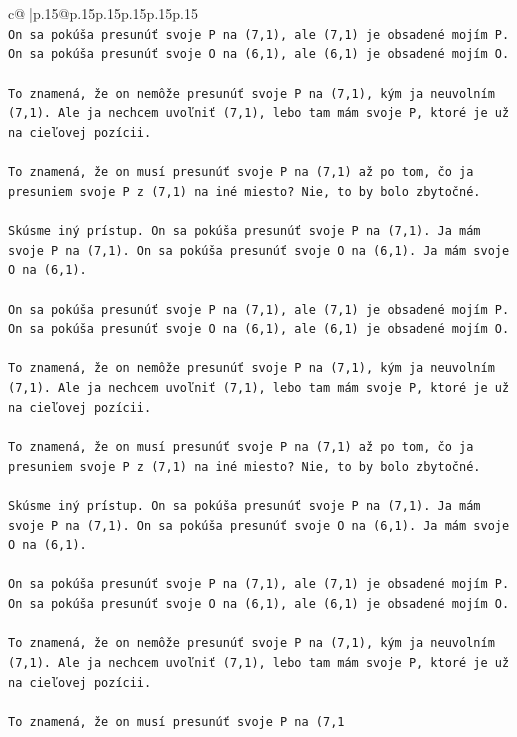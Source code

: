 \documentclass{article}
\begin{document}
{\begin{supertabular}{c@{$\;$}|p{.15\linewidth}@{}p{.15\linewidth}p{.15\linewidth}p{.15\linewidth}p{.15\linewidth}p{.15\linewidth}}
{{{\\ 
\texttt{On sa pokúša presunúť svoje P na (7,1), ale (7,1) je obsadené mojím P. On sa pokúša presunúť svoje O na (6,1), ale (6,1) je obsadené mojím O.} \\
\\ 
\texttt{To znamená, že on nemôže presunúť svoje P na (7,1), kým ja neuvolním (7,1). Ale ja nechcem uvoľniť (7,1), lebo tam mám svoje P, ktoré je už na cieľovej pozícii.} \\
\\ 
\texttt{To znamená, že on musí presunúť svoje P na (7,1) až po tom, čo ja presuniem svoje P z (7,1) na iné miesto? Nie, to by bolo zbytočné.} \\
\\ 
\texttt{Skúsme iný prístup. On sa pokúša presunúť svoje P na (7,1). Ja mám svoje P na (7,1). On sa pokúša presunúť svoje O na (6,1). Ja mám svoje O na (6,1).} \\
\\ 
\texttt{On sa pokúša presunúť svoje P na (7,1), ale (7,1) je obsadené mojím P. On sa pokúša presunúť svoje O na (6,1), ale (6,1) je obsadené mojím O.} \\
\\ 
\texttt{To znamená, že on nemôže presunúť svoje P na (7,1), kým ja neuvolním (7,1). Ale ja nechcem uvoľniť (7,1), lebo tam mám svoje P, ktoré je už na cieľovej pozícii.} \\
\\ 
\texttt{To znamená, že on musí presunúť svoje P na (7,1) až po tom, čo ja presuniem svoje P z (7,1) na iné miesto? Nie, to by bolo zbytočné.} \\
\\ 
\texttt{Skúsme iný prístup. On sa pokúša presunúť svoje P na (7,1). Ja mám svoje P na (7,1). On sa pokúša presunúť svoje O na (6,1). Ja mám svoje O na (6,1).} \\
\\ 
\texttt{On sa pokúša presunúť svoje P na (7,1), ale (7,1) je obsadené mojím P. On sa pokúša presunúť svoje O na (6,1), ale (6,1) je obsadené mojím O.} \\
\\ 
\texttt{To znamená, že on nemôže presunúť svoje P na (7,1), kým ja neuvolním (7,1). Ale ja nechcem uvoľniť (7,1), lebo tam mám svoje P, ktoré je už na cieľovej pozícii.} \\
\\ 
\texttt{To znamená, že on musí presunúť svoje P na (7,1} \\
            }
        }
    }
     \\ \\


\end{supertabular}}
\end{document}
